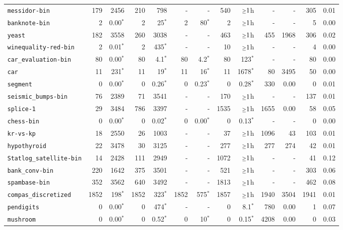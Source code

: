 \begin{tabular}{lrrrrrrrrrrrr}
\texttt{messidor-bin} & 179 & 2456 & 210 & 798 & - & - & 540 & $\mathsmaller{\geq}1$h & - & - & 305 & 0.01\\
\texttt{banknote-bin} & 2 & 0.00$^*$ & 2 & 25$^*$ & 2 & 80$^*$ & 2 & $\mathsmaller{\geq}1$h & - & - & 5 & 0.00\\
\texttt{yeast} & 182 & 3558 & 260 & 3038 & - & - & 463 & $\mathsmaller{\geq}1$h & 455 & 1968 & 306 & 0.02\\
\texttt{winequality-red-bin} & 2 & 0.01$^*$ & 2 & 435$^*$ & - & - & 10 & $\mathsmaller{\geq}1$h & - & - & 4 & 0.00\\
\texttt{car\_evaluation-bin} & 80 & 0.00$^*$ & 80 & 4.1$^*$ & 80 & 4.2$^*$ & 80 & 123$^*$ & - & - & 80 & 0.00\\
\texttt{car} & 11 & 231$^*$ & 11 & 19$^*$ & 11 & 16$^*$ & 11 & 1678$^*$ & 80 & 3495 & 50 & 0.00\\
\texttt{segment} & 0 & 0.00$^*$ & 0 & 0.26$^*$ & 0 & 0.23$^*$ & 0 & 0.28$^*$ & 330 & 0.00 & 0 & 0.01\\
\texttt{seismic\_bumps-bin} & 76 & 2389 & 71 & 3541 & - & - & 170 & $\mathsmaller{\geq}1$h & - & - & 137 & 0.01\\
\texttt{splice-1} & 29 & 3484 & 786 & 3397 & - & - & 1535 & $\mathsmaller{\geq}1$h & 1655 & 0.00 & 58 & 0.05\\
\texttt{chess-bin} & 0 & 0.00$^*$ & 0 & 0.02$^*$ & 0 & 0.00$^*$ & 0 & 0.13$^*$ & - & - & 0 & 0.00\\
\texttt{kr-vs-kp} & 18 & 2550 & 26 & 1003 & - & - & 37 & $\mathsmaller{\geq}1$h & 1096 & 43 & 103 & 0.01\\
\texttt{hypothyroid} & 22 & 3478 & 30 & 3125 & - & - & 277 & $\mathsmaller{\geq}1$h & 277 & 274 & 42 & 0.01\\
\texttt{Statlog\_satellite-bin} & 14 & 2428 & 111 & 2949 & - & - & 1072 & $\mathsmaller{\geq}1$h & - & - & 41 & 0.12\\
\texttt{bank\_conv-bin} & 220 & 1642 & 375 & 3501 & - & - & 521 & $\mathsmaller{\geq}1$h & - & - & 303 & 0.06\\
\texttt{spambase-bin} & 352 & 3562 & 640 & 3492 & - & - & 1813 & $\mathsmaller{\geq}1$h & - & - & 462 & 0.08\\
\texttt{compas\_discretized} & 1852 & 198$^*$ & 1852 & 323$^*$ & 1852 & 575$^*$ & 1857 & $\mathsmaller{\geq}1$h & 1940 & 3504 & 1941 & 0.01\\
\texttt{pendigits} & 0 & 0.00$^*$ & 0 & 474$^*$ & - & - & 0 & 8.1$^*$ & 780 & 0.00 & 1 & 0.07\\
\texttt{mushroom} & 0 & 0.00$^*$ & 0 & 0.52$^*$ & 0 & 10$^*$ & 0 & 0.15$^*$ & 4208 & 0.00 & 0 & 0.03\\

\end{tabular}
